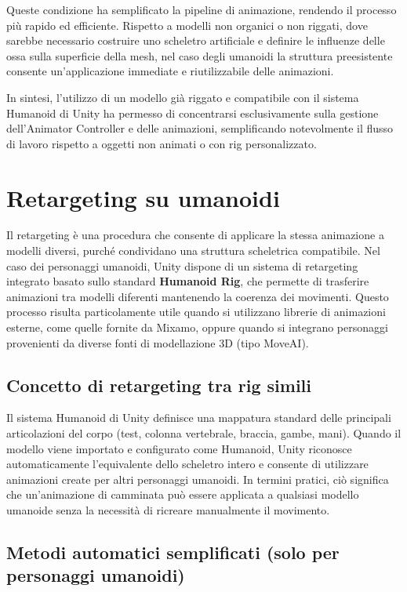 Queste condizione ha semplificato la pipeline di animazione, rendendo il processo più rapido ed efficiente. Rispetto a modelli non organici o non riggati, dove sarebbe necessario costruire uno scheletro artificiale e definire le influenze delle ossa sulla superficie della mesh, nel caso degli umanoidi la struttura preesistente consente un'applicazione immediate e riutilizzabile delle animazioni.

In sintesi, l'utilizzo di un modello già riggato e compatibile con il sistema Humanoid di Unity ha permesso di concentrarsi esclusivamente sulla gestione dell'Animator Controller e delle animazioni, semplificando notevolmente il flusso di lavoro rispetto a oggetti non animati o con rig personalizzato.


\section{Retargeting su umanoidi}

Il retargeting è una procedura che consente di applicare la stessa animazione a modelli diversi, purché condividano una struttura scheletrica compatibile. Nel caso dei personaggi umanoidi, Unity dispone di un sistema di retargeting integrato basato sullo standard \textbf{Humanoid Rig}, che permette di trasferire animazioni tra modelli diferenti mantenendo la coerenza dei movimenti. Questo processo risulta particolamente utile quando si utilizzano librerie di animazioni esterne, come quelle fornite da Mixamo, oppure quando si integrano personaggi provenienti da diverse fonti di modellazione 3D (tipo MoveAI).  

\subsection{Concetto di retargeting tra rig simili}

Il sistema Humanoid di Unity definisce una mappatura standard delle principali articolazioni del corpo (test, colonna vertebrale, braccia, gambe, mani). Quando il modello viene importato e configurato come Humanoid, Unity riconosce automaticamente l'equivalente dello scheletro intero e consente di utilizzare animazioni create per altri personaggi umanoidi.
In termini pratici, ciò significa che un'animazione di camminata può essere applicata a qualsiasi modello umanoide senza la necessità di ricreare manualmente il movimento.

\subsection{Metodi automatici semplificati (solo per personaggi umanoidi)}

